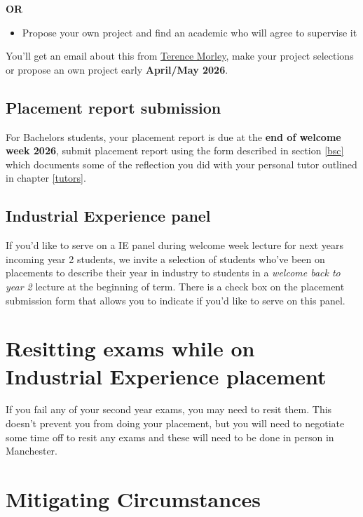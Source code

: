 \documentclass[
]{book}
\providecommand{\tightlist}{%
  \setlength{\itemsep}{0pt}\setlength{\parskip}{0pt}}
\begin{document}
\textbf{OR}

\begin{itemize}
\tightlist
\item
  Propose your own project and find an academic who will agree to supervise it
\end{itemize}

You'll get an email about this from \href{https://research.manchester.ac.uk/en/persons/terence.morley}{Terence Morley}, make your project selections or propose an own project early \textbf{April/May 2026}.

\subsection{Placement report submission}\label{five}

For Bachelors students, your placement report is due at the \textbf{end of welcome week 2026}, submit placement report using the form described in section \ref{bsc} which documents some of the reflection you did with your personal tutor outlined in chapter \ref{tutors}.

\subsection{Industrial Experience panel}\label{six}

If you'd like to serve on a IE panel during welcome week lecture for next years incoming year 2 students, we invite a selection of students who've been on placements to describe their year in industry to students in a \emph{welcome back to year 2} lecture at the beginning of term. There is a check box on the placement submission form that allows you to indicate if you'd like to serve on this panel.

\section{Resitting exams while on Industrial Experience placement}\label{resits}

If you fail any of your second year exams, you may need to resit them. This doesn't prevent you from doing your placement, but you will need to negotiate some time off to resit any exams and these will need to be done in person in Manchester. \citep{resits}

\section{Mitigating Circumstances}\label{mitcircs}
\end{document}
